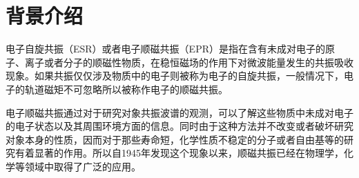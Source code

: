 %
\chapter*{背景介绍}
\label{sec:acknowledgement}
\vspace*{-10mm}

电子自旋共振（ESR）或者电子顺磁共振（EPR）是指在含有未成对电子的原子、离子或者分子的顺磁性物质，在稳恒磁场的作用下对微波能量发生的共振吸收现象。如果共振仅仅涉及物质中的电子则被称为电子的自旋共振，一般情况下，电子的轨道磁矩不可忽略所以被称作电子的顺磁共振。

电子顺磁共振通过对于研究对象共振波谱的观测，可以了解这些物质中未成对电子的电子状态以及其周围环境方面的信息。同时由于这种方法并不改变或者破坏研究对象本身的性质，因而对于那些寿命短，化学性质不稳定的分子或者自由基等的研究有着显著的作用。所以自1945年发现这个现象以来，顺磁共振已经在物理学，化学等领域中取得了广泛的应用。


